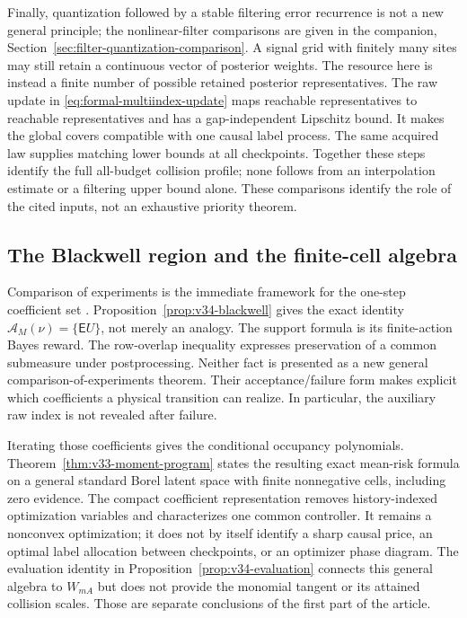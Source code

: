 Finally, quantization followed by a stable filtering error recurrence
is not a new general principle; the nonlinear-filter comparisons are
given in the companion, Section~\ref{sec:filter-quantization-comparison}.
A signal grid with finitely many sites may still retain a continuous
vector of posterior weights. The resource here is instead a finite
number of possible retained posterior representatives. The raw update
in \eqref{eq:formal-multiindex-update} maps reachable representatives
to reachable representatives and has a gap-independent Lipschitz bound.
It makes the global covers compatible with one causal label process.
The same acquired law supplies matching lower bounds at all checkpoints.
Together these steps identify the full all-budget collision profile;
none follows from an interpolation estimate or a filtering upper bound
alone. These comparisons identify the role of the cited inputs, not
an exhaustive priority theorem.

\subsection{The Blackwell region and the finite-cell algebra}
Comparison of experiments is the immediate framework for the one-step
coefficient set \cite{Blackwell1953}. Proposition~\ref{prop:v34-blackwell}
gives the exact identity $\mathscr A_M(\nu)=\{\mathsf E U\}$, not
merely an analogy. The support formula is its finite-action Bayes reward.
The row-overlap inequality expresses preservation of a common
submeasure under postprocessing. Neither fact is presented as a new
general comparison-of-experiments theorem. Their acceptance/failure
form makes explicit which coefficients a physical transition can realize.
In particular, the auxiliary raw index is not revealed after failure.

Iterating those coefficients gives the conditional occupancy polynomials.
Theorem~\ref{thm:v33-moment-program} states the resulting exact
mean-risk formula on a general standard Borel latent space with finite
nonnegative cells, including zero evidence. The compact coefficient
representation removes history-indexed optimization variables and
characterizes one common controller. It remains a nonconvex optimization;
it does not by itself identify a sharp causal price, an optimal label
allocation between checkpoints, or an optimizer phase diagram.
The evaluation identity in Proposition~\ref{prop:v34-evaluation}
connects this general algebra to $W_{mA}$ but does not provide the
monomial tangent or its attained collision scales. Those are separate
conclusions of the first part of the article.

